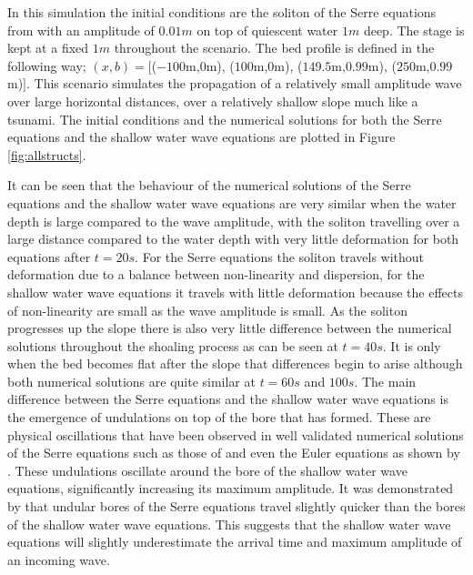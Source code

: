 \documentclass[a4paper,fleqn]{article} %
\begin{document}
In this simulation the initial conditions are the soliton of the Serre equations from \cite{El-etal-2006} with an amplitude of $0.01m$ on top of quiescent water $1m$ deep. The stage is kept at a fixed $1m$ throughout the scenario. The bed profile is defined in the following way; $(x,b) = [$($-100$m,$0$m), ($100$m,$0$m), ($149.5$m,$0.99$m), ($250$m,$0.99$m)$]$. This scenario simulates the propagation of a relatively small amplitude wave over large horizontal distances, over a relatively shallow slope much like a tsunami. The initial conditions and the numerical solutions for both the Serre equations and the shallow water wave equations are plotted in Figure \ref{fig:allstructs}.

It can be seen that the behaviour of the numerical solutions of the Serre equations and the shallow water wave equations are very similar when the water depth is large compared to the wave amplitude, with the soliton travelling over a large distance compared to the water depth with very little deformation for both equations after $t=20s$. For the Serre equations the soliton travels without deformation due to a balance between non-linearity and dispersion, for the shallow water wave equations it travels with little deformation because the effects of non-linearity are small as the wave amplitude is small. As the soliton progresses up the slope there is also very little difference between the numerical solutions throughout the shoaling process as can be seen at $t=40s$. It is only when the bed becomes flat after the slope that differences begin to arise although both numerical solutions are quite similar at $t=60s$ and $100s$. The main difference between the Serre equations and the shallow water wave equations is the emergence of undulations on top of the bore that has formed. These are physical oscillations that have been observed in well validated numerical solutions of the Serre equations such as those of \cite{Mitsotakis-etal-2014} and even the Euler equations as shown by \cite{Mitsotakis-etal-2017}. These undulations oscillate around the bore of the shallow water wave equations, significantly increasing its maximum amplitude. It was demonstrated by \cite{Pitt-2017} that undular bores of the Serre equations travel slightly quicker than the bores of the shallow water wave equations. This suggests that the shallow water wave equations will slightly underestimate the arrival time and maximum amplitude of an incoming wave.
\end{document}
